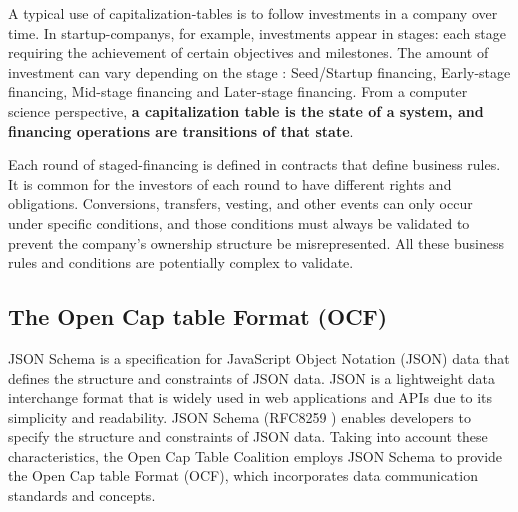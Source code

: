 

A typical use of \glspl{capitalization-table} is to follow investments in a company over time. In \glspl{startup-company}, for example, investments appear in stages: each stage requiring the achievement of certain objectives and milestones.
%
The amount of investment can vary depending on the stage \cite{Metrick}: Seed/Startup financing, Early-stage financing, Mid-stage financing and Later-stage financing. 
%
From a computer science perspective, \textbf{a capitalization table is the state of a system, and financing operations are transitions of that state}. 

Each round of \gls{staged-financing} is defined in contracts that define business rules. It is common for the investors of each round to have different rights and obligations.
%
Conversions, transfers, vesting, and other events can only occur under specific conditions, and those conditions must always be validated to prevent the company's ownership structure be misrepresented.
%
All these business rules and conditions are potentially complex to validate.


\subsection{The Open Cap table Format (OCF)}

JSON Schema is a specification for JavaScript Object Notation (JSON) data that defines the structure and constraints of JSON data. JSON is a lightweight data interchange format that is widely used in web applications and APIs due to its simplicity and readability. JSON Schema (RFC8259 \cite{RFC8259}) enables developers to specify the structure and constraints of JSON data. Taking into account these characteristics, the Open Cap Table Coalition \cite{octc} employs JSON Schema to provide the Open Cap table Format (OCF), which incorporates data communication standards and concepts. 

